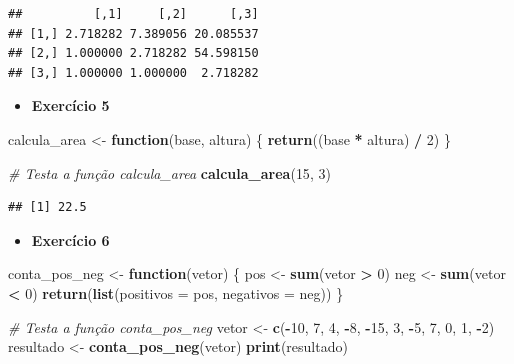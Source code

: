 \documentclass[
]{book}
\newenvironment{Shaded}{\begin{snugshade}}{\end{snugshade}}
\newcommand{\AttributeTok}[1]{\textcolor[rgb]{0.13,0.29,0.53}{#1}}
\newcommand{\CommentTok}[1]{\textcolor[rgb]{0.56,0.35,0.01}{\textit{#1}}}
\newcommand{\ControlFlowTok}[1]{\textcolor[rgb]{0.13,0.29,0.53}{\textbf{#1}}}
\newcommand{\DecValTok}[1]{\textcolor[rgb]{0.00,0.00,0.81}{#1}}
\newcommand{\FunctionTok}[1]{\textcolor[rgb]{0.13,0.29,0.53}{\textbf{#1}}}
\newcommand{\NormalTok}[1]{#1}
\newcommand{\OtherTok}[1]{\textcolor[rgb]{0.56,0.35,0.01}{#1}}
\newcommand{\SpecialCharTok}[1]{\textcolor[rgb]{0.81,0.36,0.00}{\textbf{#1}}}
\providecommand{\tightlist}{%
  \setlength{\itemsep}{0pt}\setlength{\parskip}{0pt}}
\begin{document}
\begin{verbatim}
##          [,1]     [,2]      [,3]
## [1,] 2.718282 7.389056 20.085537
## [2,] 1.000000 2.718282 54.598150
## [3,] 1.000000 1.000000  2.718282
\end{verbatim}

\begin{itemize}
\tightlist
\item
  \textbf{Exercício 5}
\end{itemize}

\begin{Shaded}
\begin{Highlighting}[]
\NormalTok{calcula\_area }\OtherTok{\textless{}{-}} \ControlFlowTok{function}\NormalTok{(base, altura) \{}
  \FunctionTok{return}\NormalTok{((base }\SpecialCharTok{*}\NormalTok{ altura) }\SpecialCharTok{/} \DecValTok{2}\NormalTok{)}
\NormalTok{\}}

\CommentTok{\# Testa a função \textquotesingle{}calcula\_area\textquotesingle{}}
\FunctionTok{calcula\_area}\NormalTok{(}\DecValTok{15}\NormalTok{, }\DecValTok{3}\NormalTok{)}
\end{Highlighting}
\end{Shaded}

\begin{verbatim}
## [1] 22.5
\end{verbatim}

\begin{itemize}
\tightlist
\item
  \textbf{Exercício 6}
\end{itemize}

\begin{Shaded}
\begin{Highlighting}[]
\NormalTok{conta\_pos\_neg }\OtherTok{\textless{}{-}} \ControlFlowTok{function}\NormalTok{(vetor) \{}
\NormalTok{  pos }\OtherTok{\textless{}{-}} \FunctionTok{sum}\NormalTok{(vetor }\SpecialCharTok{\textgreater{}} \DecValTok{0}\NormalTok{)}
\NormalTok{  neg }\OtherTok{\textless{}{-}} \FunctionTok{sum}\NormalTok{(vetor }\SpecialCharTok{\textless{}} \DecValTok{0}\NormalTok{)}
  \FunctionTok{return}\NormalTok{(}\FunctionTok{list}\NormalTok{(}\AttributeTok{positivos =}\NormalTok{ pos, }\AttributeTok{negativos =}\NormalTok{ neg))}
\NormalTok{\}}

\CommentTok{\# Testa a função \textquotesingle{}conta\_pos\_neg\textquotesingle{}}
\NormalTok{vetor }\OtherTok{\textless{}{-}} \FunctionTok{c}\NormalTok{(}\SpecialCharTok{{-}}\DecValTok{10}\NormalTok{, }\DecValTok{7}\NormalTok{, }\DecValTok{4}\NormalTok{, }\SpecialCharTok{{-}}\DecValTok{8}\NormalTok{, }\SpecialCharTok{{-}}\DecValTok{15}\NormalTok{, }\DecValTok{3}\NormalTok{, }\SpecialCharTok{{-}}\DecValTok{5}\NormalTok{, }\DecValTok{7}\NormalTok{, }\DecValTok{0}\NormalTok{, }\DecValTok{1}\NormalTok{, }\SpecialCharTok{{-}}\DecValTok{2}\NormalTok{)}
\NormalTok{resultado }\OtherTok{\textless{}{-}} \FunctionTok{conta\_pos\_neg}\NormalTok{(vetor)}
\FunctionTok{print}\NormalTok{(resultado)}
\end{Highlighting}
\end{Shaded}
\end{document}
